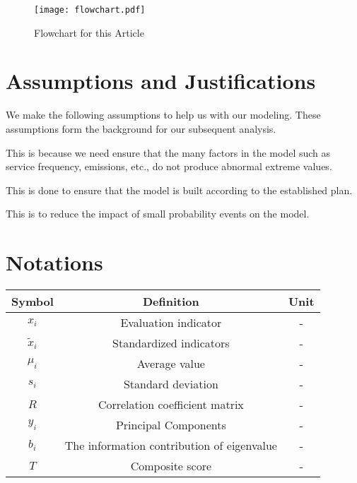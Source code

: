 \documentclass[12pt]{article}
\begin{document}
\begin{figure}[H]
	\centering
	\texttt{[image: flowchart.pdf]}%
	\caption{Flowchart for this Article} %
	\label{1} 
\end{figure}


\section{Assumptions and Justifications}
We make the following assumptions to help us with our modeling. These assumptions form the background for our subsequent analysis.

This is because we need ensure that the many factors in the model such as service 
frequency, emissions, etc., do not produce abnormal extreme values.

This is done to ensure that the model is built according to the established plan.


This is to reduce the impact of small 
probability events on the model.

\section{Notations}
\begin{table}[!htbp]
\centering
    \begin{tabular}{ccc}
	\toprule
	Symbol&Definition&Unit\\
	\midrule
	\(x_i\)&Evaluation indicator&-\\
	\({\tilde x_i}\)&Standardized indicators&-\\
	\({\mu _i}\)&Average value&-\\
	\(s_i\)&Standard deviation&-\\
	\({R}\)&Correlation coefficient matrix&-\\
	\(y_i\)&Principal Components&-\\
	\(b_i\)&The information contribution of eigenvalue&-\\
	\(T\)&Composite score&-\\
	\bottomrule
    \end{tabular}
\end{table}
\end{document}
